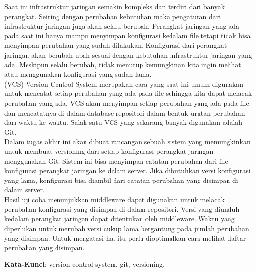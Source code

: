 \begin{abstrak}
        Saat ini infrastruktur jaringan semakin kompleks dan terdiri dari banyak perangkat. Seiring dengan perubahan kebutuhan maka pengaturan dari infrastruktur jaringan juga akan selalu berubah. Perangkat jaringan yang ada pada saat ini hanya mampu menyimpan konfigurasi kedalam file tetapi tidak bisa menyimpan perubahan yang sudah dilakukan. Konfigurasi dari perangkat jaringan akan berubah-ubah sesuai dengan kebutuhan infrastruktur jaringan yang ada. Meskipun selalu berubah, tidak menutup kemungkinan kita ingin melihat atau menggunakan konfigurasi yang sudah lama.\\
		\indent (VCS) Version Control System  merupakan cara yang saat ini umum digunakan untuk mencatat setiap perubahan yang ada pada file sehingga kita dapat melacak perubahan yang ada. VCS akan menyimpan setiap perubahan yang ada pada file dan mencatatnya di dalam database repositori dalam bentuk urutan perubahan dari waktu ke waktu. Salah satu VCS yang sekarang banyak digunakan adalah Git.\\
		\indent Dalam tugas akhir ini akan dibuat rancangan sebuah sistem yang memungkinkan untuk membuat versioning dari setiap konfigurasi perangkat jaringan menggunakan Git. Sistem ini bisa menyimpan catatan perubahan dari file konfigurasi perangkat jaringan ke dalam server. Jika dibutuhkan versi konfigurasi yang lama, konfigurasi bisa diambil dari catatan perubahan yang disimpan di dalam server.\\
		\indent Hasil uji coba menunjukkan middleware dapat digunakan untuk melacak perubahan konfigurasi yang disimpan di dalam repositori. Versi yang diunduh kedalam perangkat jaringan dapat ditentukan oleh middleware. Waktu yang diperlukan untuk merubah versi cukup lama bergantung pada jumlah perubahan yang disimpan. Untuk mengatasi hal itu perlu dioptimalkan cara melihat daftar perubahan yang disimpan.

	\noindent \textbf{Kata-Kunci}: version control system, git, versioning.
\end{abstrak}
\newpage
